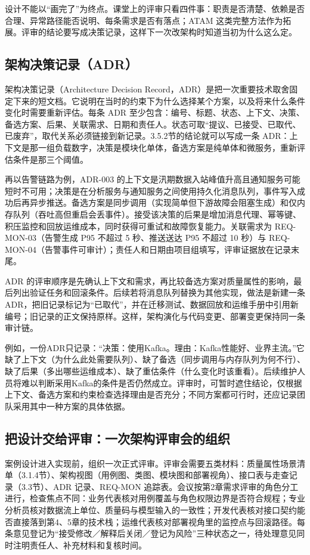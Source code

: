 设计不能以“画完了”为终点。课堂上的评审只看四件事：职责是否清楚、依赖是否合理、异常路径能否说明、每条需求是否有落点；ATAM 这类完整方法作为拓展。评审的结论要写成决策记录，这样下一次改架构时知道当初为什么这么定。

\subsection{架构决策记录（ADR）}

架构决策记录（Architecture Decision Record，ADR）是把一次重要技术取舍固定下来的短文档。它说明在当时的约束下为什么选择某个方案，以及将来什么条件变化时需要重新评估。每条 ADR 至少包含：编号、标题、状态、上下文、决策、备选方案、后果、关联需求、日期和责任人。状态可取“提议、已接受、已取代、已废弃”，取代关系必须链接到新记录。3.5.2节的结论就可以写成一条 ADR：上下文是那一组负载数字，决策是模块化单体，备选方案是纯单体和微服务，重新评估条件是那三个阈值。

再以告警链路为例，ADR-003 的上下文是汛期数据入站峰值升高且通知服务可能短时不可用；决策是在分析服务与通知服务之间使用持久化消息队列，事件写入成功后再异步推送。备选方案是同步调用（实现简单但下游故障会阻塞生成）和仅内存队列（吞吐高但重启会丢事件）。接受该决策的后果是增加消息代理、幂等键、积压监控和回放运维成本，同时获得可重试和故障恢复能力。关联需求为 REQ-MON-03（告警生成 P95 不超过 5 秒、推送送达 P95 不超过 10 秒）与 REQ-MON-04（告警事件可审计）；责任人和日期由项目组填写，评审证据放在记录末尾。

ADR 的评审顺序是先确认上下文和需求，再比较备选方案对质量属性的影响，最后列出验证任务和回滚条件。后续若将消息队列替换为其他实现，做法是新建一条 ADR，把旧记录标记为“已取代”，并在迁移测试、数据回放和运维手册中引用新编号；旧记录的正文保持原样。这样，架构演化与代码变更、部署变更保持同一条审计链。

例如，一份ADR只记录：“决策：使用Kafka。理由：Kafka性能好、业界主流。”它缺了上下文（为什么此处需要队列）、缺了备选（同步调用与内存队列为何不行）、缺了后果（多出哪些运维成本）、缺了重估条件（什么变化时该重看）。后续维护人员将难以判断采用Kafka的条件是否仍然成立。评审时，可暂时遮住结论，仅根据上下文、备选方案和约束检查选择理由是否充分；不同方案都可行时，还应记录团队采用其中一种方案的具体依据。

\subsection{把设计交给评审：一次架构评审会的组织}

案例设计进入实现前，组织一次正式评审。评审会需要五类材料：质量属性场景清单（3.1.4节）、架构视图（用例图、类图、模块图和部署视角）、接口表与走查记录（3.3节）、ADR 记录、REQ-MON 追踪表。会议按第2章需求评审的角色分工进行，检查焦点不同：业务代表核对用例覆盖与角色权限边界是否符合规程；专业分析员核对数据流上单位、质量码与模型输入的一致性；开发代表核对接口契约能否直接落到第4、5章的技术栈；运维代表核对部署视角里的监控点与回滚路径。每条意见登记为“接受修改／解释后关闭／登记为风险”三种状态之一，待处理意见同时注明责任人、补充材料和复核时间。

